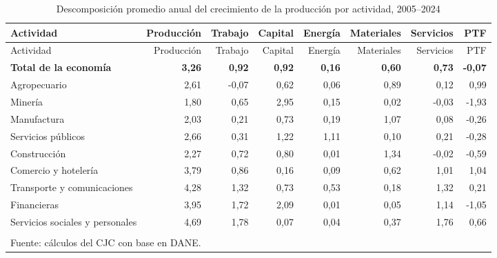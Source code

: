 \begingroup
\small
\setlength{\tabcolsep}{4pt}
\begin{longtable}{p{4.45cm}rrrrrrr}
\caption{Descomposición promedio anual del crecimiento de la producción por actividad, 2005--2024}
\label{tab:descomposicion_largo_plazo}\\
\toprule
Actividad & Producción & Trabajo & Capital & Energía & Materiales & Servicios & PTF \\
\midrule
\endfirsthead
\toprule
Actividad & Producción & Trabajo & Capital & Energía & Materiales & Servicios & PTF \\
\midrule
\endhead
\textbf{Total de la economía} & \textbf{3,26} & \textbf{0,92} & \textbf{0,92} & \textbf{0,16} & \textbf{0,60} & \textbf{0,73} & \textbf{-0,07} \\
\midrule
Agropecuario & 2,61 & -0,07 & 0,62 & 0,06 & 0,89 & 0,12 & 0,99 \\
Minería & 1,80 & 0,65 & 2,95 & 0,15 & 0,02 & -0,03 & -1,93 \\
Manufactura & 2,03 & 0,21 & 0,73 & 0,19 & 1,07 & 0,08 & -0,26 \\
Servicios públicos & 2,66 & 0,31 & 1,22 & 1,11 & 0,10 & 0,21 & -0,28 \\
Construcción & 2,27 & 0,72 & 0,80 & 0,01 & 1,34 & -0,02 & -0,59 \\
Comercio y hotelería & 3,79 & 0,86 & 0,16 & 0,09 & 0,62 & 1,01 & 1,04 \\
Transporte y comunicaciones & 4,28 & 1,32 & 0,73 & 0,53 & 0,18 & 1,32 & 0,21 \\
Financieras & 3,95 & 1,72 & 2,09 & 0,01 & 0,05 & 1,14 & -1,05 \\
Servicios sociales y personales & 4,69 & 1,78 & 0,07 & 0,04 & 0,37 & 1,76 & 0,66 \\
\bottomrule
\multicolumn{8}{p{15.9cm}}{\footnotesize %
}\\
\multicolumn{8}{l}{\footnotesize Fuente: cálculos del CJC con base en DANE.}\\
\end{longtable}
\endgroup
